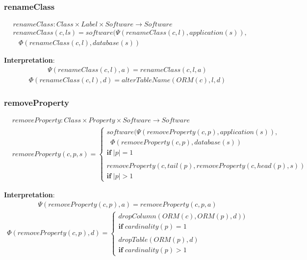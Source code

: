 \documentclass[10pt]{article}
\begin{document}
\subsubsection{renameClass}
\begin{align}
& renameClass: Class \times Label \times Software \rightarrow Software \nonumber \\
& renameClass(c, l s) = software(\Psi(renameClass(c, l), application(s)), \nonumber \\
& \;\;\; \Phi(renameClass(c, l), database(s))
\end{align}

\noindent \textbf{Interpretation}:
\begin{align}
\Psi(renameClass(c, l), a) = renameClass(c, l, a)
\end{align}
\begin{align}
\Phi(renameClass(c, l), d) = alterTableName(ORM(c), l, d)
\end{align}

\subsubsection{removeProperty}
\begin{align}
& removeProperty: Class \times Property \times Software \rightarrow Software \nonumber \\
& removeProperty(c, p, s) = \begin{cases}
    software(\Psi(removeProperty(c, p), application(s)),  \\ 
        \;\; \Phi(removeProperty(c, p), database(s)) \\
    \mathbf{if} \; |p| = 1 \\\\
    removeProperty(c, tail(p), removeProperty(c, head(p), s)) \\
        \mathbf{if} \; |p| > 1
 \end{cases}
\end{align}

\noindent \textbf{Interpretation}:
\begin{align}
\Psi(removeProperty(c, p), a) = removeProperty(c, p, a)
\end{align}
\begin{align}
\Phi(removeProperty(c, p), d) = \begin{cases}
 dropColumn(ORM(c), ORM(p), d)) \\ \mathbf{if} \; cardinality(p) = 1  \\\\ 
 dropTable(ORM(p), d) \\ \mathbf{if} \; cardinality(p) > 1 
 \end{cases}
\end{align}
\end{document}
